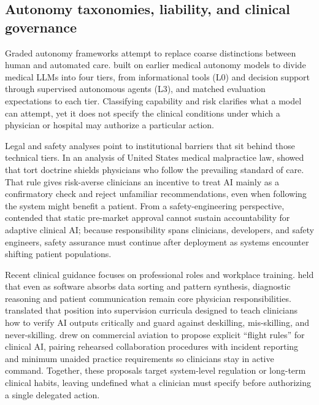 \subsection{Autonomy taxonomies, liability, and clinical governance}

Graded autonomy frameworks attempt to replace coarse distinctions between human and automated care. \citet{ye2025autonomy} built on earlier medical autonomy models \citep{bitterman2020autonomy} to divide medical LLMs into four tiers, from informational tools (L0) and decision support through supervised autonomous agents (L3), and matched evaluation expectations to each tier. Classifying capability and risk clarifies what a model can attempt, yet it does not specify the clinical conditions under which a physician or hospital may authorize a particular action.

Legal and safety analyses point to institutional barriers that sit behind those technical tiers. In an analysis of United States medical malpractice law, \citet{price2019liability} showed that tort doctrine shields physicians who follow the prevailing standard of care. That rule gives risk-averse clinicians an incentive to treat AI mainly as a confirmatory check and reject unfamiliar recommendations, even when following the system might benefit a patient. From a safety-engineering perspective, \citet{habli2020accountability} contended that static pre-market approval cannot sustain accountability for adaptive clinical AI; because responsibility spans clinicians, developers, and safety engineers, safety assurance must continue after deployment as systems encounter shifting patient populations.

Recent clinical guidance focuses on professional roles and workplace training. \citet{clayton2025clinicians} held that even as software absorbs data sorting and pattern synthesis, diagnostic reasoning and patient communication remain core physician responsibilities. \citet{abdulnour2025education} translated that position into supervision curricula designed to teach clinicians how to verify AI outputs critically and guard against deskilling, mis-skilling, and never-skilling. \citet{ong2026flight} drew on commercial aviation to propose explicit ``flight rules'' for clinical AI, pairing rehearsed collaboration procedures with incident reporting and minimum unaided practice requirements so clinicians stay in active command. Together, these proposals target system-level regulation or long-term clinical habits, leaving undefined what a clinician must specify before authorizing a single delegated action.

